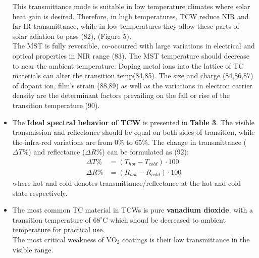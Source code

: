 \begin{itemize}
   This transmittance mode is suitable in low temperature climates where solar heat gain is desired.
   Therefore, in high temperatures, TCW reduce NIR and far-IR transmittance, while in low temperatures
   they allow these parts of solar adiation to pass (82), (Figure 5). \\
   The MST is fully reversible, co-occurred with large variations in electrical and optical 
   properties in NIR range (83). The MST temperature should decrease to near the ambient
   temperature. Doping metal ions into the lattice of TC materials can alter the transition temp(84,85).
   The size and charge (84,86,87) of dopant ion, film's strain (88,89) as well as the variations in
   electron carrier density are the determinant factors prevailing on the fall or rise of the transition
   temperature (90).
\item The \textbf{Ideal spectral behavior of TCW} is presented in \textbf{Table 3}. 
   The visible transmission and reflectance should be equal on both sides of transition, 
   while the infra-red variations
   are from $0\%$ to $65\%$. The change in transmittance ($\Delta T \% $) and reflectance ($ \Delta R \% $)
   can be formulated as (92):
   \begin{align*}
   \Delta T \% &= ( T_{hot} - T_{cold} ) \cdot 100 \\
   \Delta R \% &= ( R_{hot} - R_{cold} ) \cdot 100
   \end{align*}
   where hot and cold denotes transmittance/reflectance at the hot and cold state respectively.
\item The most common TC material in TCWs is pure \textbf{vanadium dioxide}, with a transition temperature of
   $68  ^{\circ}$C which shoud be decreased to ambient temperature for practical use.\\
   The most critical weakness of VO$_2$ coatings is their low transmittance in the visible range.

\end{itemize}
